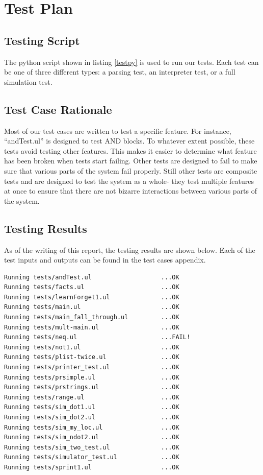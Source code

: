 \documentclass[onecolumn,titlepage]{article}
\begin{document}
\section{Test Plan}

\subsection{Testing Script}
The python script shown in listing \ref{testpy} is used to run our
tests.  Each test can be one of three different types: a parsing test,
an interpreter test, or a full simulation test.

\singlespace
\lstset{caption=Testing Script,label=testpy}

\onehalfspace 

\subsection{Test Case Rationale}
Most of our test cases are written to test a specific feature.  For
instance, ``andTest.ul'' is designed to test AND blocks.  To whatever
extent possible, these tests avoid testing other features.  This makes
it easier to determine what feature has been broken when tests start
failing.  Other tests are designed to fail to make sure that various
parts of the system fail properly.  Still other tests are composite
tests and are designed to test the system as a whole- they test
multiple features at once to ensure that there are not bizarre
interactions between various parts of the system.

\subsection{Testing Results}
As of the writing of this report, the testing results are shown
below.  Each of the test inputs and outputs can be found in the test
cases appendix.

\begin{verbatim}
Running tests/andTest.ul                   ...OK
Running tests/facts.ul                     ...OK
Running tests/learnForget1.ul              ...OK
Running tests/main.ul                      ...OK
Running tests/main_fall_through.ul         ...OK
Running tests/mult-main.ul                 ...OK
Running tests/neq.ul                       ...FAIL!
Running tests/not1.ul                      ...OK
Running tests/plist-twice.ul               ...OK
Running tests/printer_test.ul              ...OK
Running tests/prsimple.ul                  ...OK
Running tests/prstrings.ul                 ...OK
Running tests/range.ul                     ...OK
Running tests/sim_dot1.ul                  ...OK
Running tests/sim_dot2.ul                  ...OK
Running tests/sim_my_loc.ul                ...OK
Running tests/sim_ndot2.ul                 ...OK
Running tests/sim_two_test.ul              ...OK
Running tests/simulator_test.ul            ...OK
Running tests/sprint1.ul                   ...OK
\end{verbatim}
\end{document}
